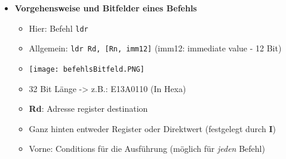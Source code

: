 \begin{itemize}
        \item \textbf{Vorgehensweise und Bitfelder eines Befehls}
            \begin{itemize}
                \item Hier: Befehl \texttt{ldr}
                \item Allgemein: \texttt{ldr Rd, [Rn, imm12]} (imm12: immediate value - 12 Bit)
                \item[] \texttt{[image: befehlsBitfeld.PNG]}
                \item 32 Bit Länge -> z.B.: E13A0110 (In Hexa)
                \item \textbf{Rd}: Adresse register destination
                \item Ganz hinten entweder Register oder Direktwert (festgelegt durch \textbf{I})
                \item Vorne: Conditions für die Ausführung (möglich für \textit{jeden} Befehl)
            \end{itemize}
    \end{itemize}

